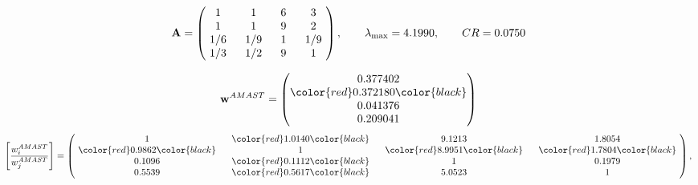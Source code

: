 \begin{example}
\begin{equation*}
\mathbf{A} =
\begin{pmatrix}
$\,\,$ 1 $\,\,$ & $\,\,$1$\,\,$ & $\,\,$6$\,\,$ & $\,\,$3 $\,\,$ \\
$\,\,$ 1 $\,\,$ & $\,\,$ 1 $\,\,$ & $\,\,$9$\,\,$ & $\,\,$2 $\,\,$ \\
$\,\,$ 1/6$\,\,$ & $\,\,$ 1/9$\,\,$ & $\,\,$ 1 $\,\,$ & $\,\,$ 1/9 $\,\,$ \\
$\,\,$ 1/3$\,\,$ & $\,\,$ 1/2$\,\,$ & $\,\,$9$\,\,$ & $\,\,$ 1  $\,\,$ \\
\end{pmatrix},
\qquad
\lambda_{\max} =
4.1990,
\qquad
CR = 0.0750
\end{equation*}

\begin{equation*}
\mathbf{w}^{AMAST} =
\begin{pmatrix}
0.377402\\
\color{red} 0.372180\color{black} \\
0.041376\\
0.209041
\end{pmatrix}\end{equation*}
\begin{equation*}
\left[ \frac{{w}^{AMAST}_i}{{w}^{AMAST}_j} \right] =
\begin{pmatrix}
$\,\,$ 1 $\,\,$ & $\,\,$\color{red} 1.0140\color{black} $\,\,$ & $\,\,$9.1213$\,\,$ & $\,\,$1.8054$\,\,$ \\
$\,\,$\color{red} 0.9862\color{black} $\,\,$ & $\,\,$ 1 $\,\,$ & $\,\,$\color{red} 8.9951\color{black} $\,\,$ & $\,\,$\color{red} 1.7804\color{black}   $\,\,$ \\
$\,\,$0.1096$\,\,$ & $\,\,$\color{red} 0.1112\color{black} $\,\,$ & $\,\,$ 1 $\,\,$ & $\,\,$0.1979 $\,\,$ \\
$\,\,$0.5539$\,\,$ & $\,\,$\color{red} 0.5617\color{black} $\,\,$ & $\,\,$5.0523$\,\,$ & $\,\,$ 1  $\,\,$ \\
\end{pmatrix},
\end{equation*}


\end{example}
